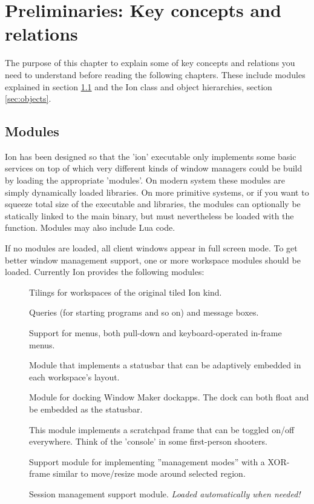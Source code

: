 
\chapter{Preliminaries: Key concepts and relations}
\label{chap:prelim}

The purpose of this chapter to explain some of key concepts and
relations you need to understand before reading the following
chapters. These include modules explained in section \ref{sec:modules}
and the Ion class and object hierarchies, section \ref{sec:objects}.


\section{Modules}
\label{sec:modules}

Ion has been designed so that the 'ion' executable only implements some
basic services on top of which very different kinds of window managers
could be build by loading the appropriate 'modules'. On modern system
these modules are simply dynamically loaded  libraries. On 
more primitive systems, or if you want to squeeze total size of the 
executable and libraries, the modules can optionally be statically 
linked to the main binary, but must nevertheless be loaded with the
 function. Modules may also include Lua code.

If no modules are loaded, all client windows appear in full screen mode.
To get better window management support, one or more workspace modules
should be loaded. Currently Ion provides the following modules:

\begin{description}
    \item[] Tilings for workspaces of the original tiled
       Ion kind.
    \item[] Queries (for starting programs and so on)
      and message boxes.
    \item[] Support for menus, both pull-down and
      keyboard-operated in-frame menus.
    \item[] Module that implements a statusbar that
      can be adaptively embedded in each workspace's layout.
    \item[] Module for docking Window Maker dockapps.
      The dock can both float and be embedded as the statusbar.
    \item[] This module implements a scratchpad frame that can
      be toggled on/off everywhere. Think of the 'console' in some 
      first-person shooters.
    \item[] Support module for implementing ''management
      modes'' with a XOR-frame similar to move/resize mode around selected
      region.
    \item[] Session management support module.
      \emph{Loaded automatically when needed!}
\end{description}

